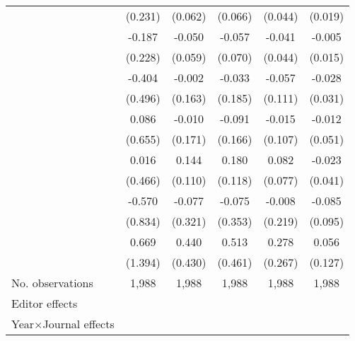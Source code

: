 \begin{table}
\begin{threeparttable}
\begin{tabular}{p{3cm}S@{}S@{}S@{}S@{}S@{}}
                                          &     (0.231)   &     (0.062)   &     (0.066)   &     (0.044)   &     (0.019)   \\
            &      -0.187   &      -0.050   &      -0.057   &      -0.041   &      -0.005   \\
                                          &     (0.228)   &     (0.059)   &     (0.070)   &     (0.044)   &     (0.015)   \\
                &      -0.404   &      -0.002   &      -0.033   &      -0.057   &      -0.028   \\
                                          &     (0.496)   &     (0.163)   &     (0.185)   &     (0.111)   &     (0.031)   \\
                        &       0.086   &      -0.010   &      -0.091   &      -0.015   &      -0.012   \\
                                          &     (0.655)   &     (0.171)   &     (0.166)   &     (0.107)   &     (0.051)   \\
                     &       0.016   &       0.144   &       0.180   &       0.082   &      -0.023   \\
                                          &     (0.466)   &     (0.110)   &     (0.118)   &     (0.077)   &     (0.041)   \\
                         &      -0.570   &      -0.077   &      -0.075   &      -0.008   &      -0.085   \\
                                          &     (0.834)   &     (0.321)   &     (0.353)   &     (0.219)   &     (0.095)   \\
                      &       0.669   &       0.440   &       0.513   &       0.278   &       0.056   \\
                                          &     (1.394)   &     (0.430)   &     (0.461)   &     (0.267)   &     (0.127)   \\
            \midrule
            No. observations              &       1,988   &       1,988   &       1,988   &       1,988   &       1,988   \\
            \midrule
            Editor effects       &           {}   &           {}   &           {}   &           {}   &           {}   \\
            Year\(\times\)Journal effects          &           {}   &           {}   &           {}   &           {}   &           {}   \\

\end{tabular}
\end{threeparttable}
\end{table}
